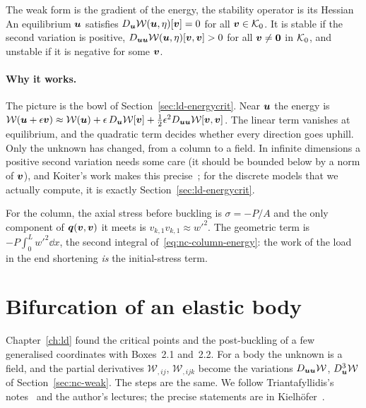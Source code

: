\begin{gbox}{The weak form is the gradient of the energy, the stability operator is its Hessian}\label{sec:nc-weakgbox}
%
An equilibrium $\bm{u}$ satisfies $D_{\bm{u}}\mathcal{W}(\bm{u},\eta)[\bm{v}] = 0$ for all $\bm{v}\in\mathcal{K}_0$.
It is stable if the second variation is positive,
$D_{\bm{u}\bm{u}}\mathcal{W}(\bm{u},\eta)[\bm{v},\bm{v}] > 0$ for all $\bm{v} \neq \bm{0}$ in $\mathcal{K}_0$, and
unstable if it is negative for some $\bm{v}$.
\end{gbox}

\paragraph{Why it works.}
The picture is the bowl of Section~\ref{sec:ld-energycrit}. Near $\bm{u}$ the energy is
$\mathcal{W}(\bm{u} + \epsilon\bm{v}) \approx \mathcal{W}(\bm{u}) + \epsilon\,D_{\bm{u}}\mathcal{W}[\bm{v}]
+ \tfrac12\epsilon^2 D_{\bm{u}\bm{u}}\mathcal{W}[\bm{v},\bm{v}]$. The linear term vanishes at equilibrium,
and the quadratic term decides whether every direction goes uphill. Only the
unknown has changed, from a column to a field. In infinite dimensions a positive
second variation needs some care (it should be bounded below by a norm of $\bm{v}$), and
Koiter's work makes this precise~\cite{nc-koiter1945}; for the discrete models that we
actually compute, it is exactly Section~\ref{sec:ld-energycrit}.

For the column, the axial stress before buckling is $\sigma = -P/A$ and the only
component of $\bm{q}(\bm{v},\bm{v})$ it meets is $v_{k,1}v_{k,1} \approx w'^2$. The geometric
term is $\displaystyle -P\int_0^L w'^2\dd x$, the second integral of~\eqref{eq:nc-column-energy}: the
work of the load in the end shortening \emph{is} the initial-stress term.

\section{Bifurcation of an elastic body}\label{sec:nc-bif}
%

Chapter~\ref{ch:ld} found the critical points and the post-buckling of a few
generalised coordinates with Boxes~2.1 and~2.2. For a body the unknown is a field,
and the partial derivatives $\mathcal{W}_{,ij}$, $\mathcal{W}_{,ijk}$ become the
variations $D_{\bm{u}\bm{u}}\mathcal{W}$, $D^3_{\bm{u}}\mathcal{W}$ of
Section~\ref{sec:nc-weak}. The steps are the same. We follow Triantafyllidis's
notes~\cite[Section~AC]{nc-triantafyllidis2011} and the author's lectures; the precise
statements are in Kielh\"ofer~\cite[Sections~I.5--I.7]{nc-kielhofer2004}.

